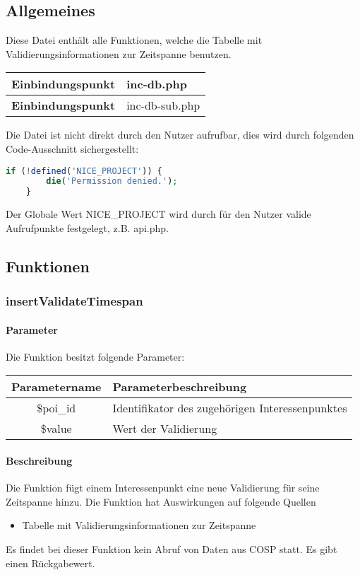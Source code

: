 \subsection{Allgemeines} Diese Datei enthält alle Funktionen, welche die Tabelle mit Validierungsinformationen zur Zeitspanne benutzen.
\begin{table}[H]
	\begin{tabular}{|c|p{11cm}|}
		\hline
		\textbf{Einbindungspunkt} & inc-db.php \\ \hline
		\textbf{Einbindungspunkt} & inc-db-sub.php \\ \hline
	\end{tabular}
\end{table}
Die Datei ist nicht direkt durch den Nutzer aufrufbar, dies wird durch folgenden Code-Ausschnitt sichergestellt:
\begin{lstlisting}[language=php]
	if (!defined('NICE_PROJECT')) {
		die('Permission denied.');
	}
\end{lstlisting}
Der Globale Wert {\glqq NICE\_PROJECT\grqq} wird durch für den Nutzer valide Aufrufpunkte festgelegt, z.B. {\glqq api.php\grqq}.
\newpage
\subsection{Funktionen}
\subsubsection{insertValidateTimespan}
\paragraph{Parameter} Die Funktion besitzt folgende Parameter:
\begin{table}[H]
	\begin{tabular}{|c|p{11cm}|}
		\hline
		\textbf{Parametername} & \textbf{Parameterbeschreibung} \\ \hline
		\$poi\_id & Identifikator des zugehörigen Interessenpunktes \\ \hline
		\$value   & Wert der Validierung \\ \hline
	\end{tabular}
\end{table}
\paragraph{Beschreibung} Die Funktion fügt einem Interessenpunkt eine neue Validierung für seine Zeitspanne hinzu. Die Funktion hat Auswirkungen auf folgende Quellen
\begin{itemize}
	\item Tabelle mit Validierungsinformationen zur Zeitspanne
\end{itemize}
Es findet bei dieser Funktion kein Abruf von Daten aus {\glqq COSP\grqq} statt. Es gibt einen Rückgabewert.
